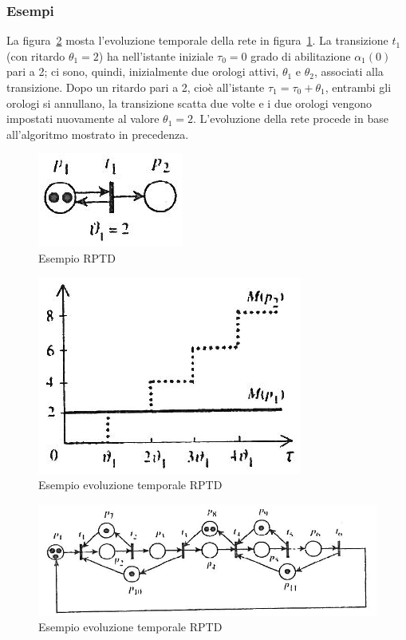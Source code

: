 \documentclass[a4paper]{report}
\begin{document}
\subsubsection{Esempi}
La figura~\ref{fig:rptd-evoluzione01} mosta l'evoluzione temporale
della rete in figura~\ref{fig:rptd-evoluzione00}. La transizione $t_1$ (con
ritardo $\theta_1 = 2$) ha nell'istante iniziale $\tau_0 = 0$ grado di
abilitazione $\alpha_1(0)$ pari a 2; ci sono, quindi, inizialmente due
orologi attivi, $\theta_1$ e $\theta_2$, associati alla
transizione. Dopo un ritardo pari a 2, cio\`e all'istante $\tau_1 =
\tau_0 + \theta_1$, entrambi gli orologi si annullano, la transizione
scatta due volte e i due orologi vengono impostati nuovamente al
valore $\theta_1 = 2$. L'evoluzione della rete procede in base
all'algoritmo mostrato in precedenza.
\begin{figure}[!h]
  \begin{center}
    \includegraphics[scale=0.4]{./images/rptd-evoluzione00.png}
    \caption{Esempio RPTD}
    \label{fig:rptd-evoluzione00}
  \end{center}
\end{figure}
\begin{figure}[!h]
  \begin{center}
    \includegraphics[scale=0.4]{./images/rptd-evoluzione01.png}
    \caption{Esempio evoluzione temporale RPTD}
    \label{fig:rptd-evoluzione01}
  \end{center}
\end{figure}
\begin{figure}[!h]
  \begin{center}
    \includegraphics[scale=0.4]{./images/rptd-evoluzione04.png}
    \caption{Esempio evoluzione temporale RPTD}
    \label{fig:rptd-evoluzione04}
  \end{center}
\end{figure}
\end{document}
